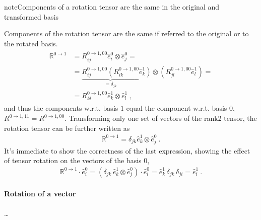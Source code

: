 \documentclass[letterpaper,10pt,english]{jupyterBook}
\begin{document}
\begin{sphinxadmonition}{note}{Components of a rotation tensor are the same in the original and transformed basis}

\sphinxAtStartPar
Components of the rotation tensor are the same if referred to the original or to the rotated basis.
\begin{equation*}
\begin{split}\begin{aligned}
  \mathbb{R}^{0 \rightarrow 1} 
  & = R^{0 \rightarrow 1, 00}_{ij} \hat{e}^0_i \otimes \hat{e}^0_j = \\
  & = \underbrace{ R^{0 \rightarrow 1, 00}_{ij}  \left( R^{0 \rightarrow 1, 00 }_{ik}\right.}_{= \delta_{jk}} \left. \hat{e}^1_k \right) \otimes \left( R^{0 \rightarrow 1, 00}_{jl} \hat{e}^1_l \right) = \\
  & = R^{0 \rightarrow 1, 00}_{kl} \hat{e}^1_k \otimes \hat{e}^1_{l} \ ,
\end{aligned}\end{split}
\end{equation*}
\sphinxAtStartPar
and thus the components w.r.t. basis \(1\) equal the component w.r.t. basis \(0\), \(R^{0 \rightarrow 1, 11} = R^{0\rightarrow 1, 00}\).
Transforming only one set of vectors of the rank\sphinxhyphen{}2 tensor, the rotation tensor can be further written as
\begin{equation*}
\begin{split}\mathbb{R}^{0 \rightarrow 1} = \delta_{jk} \hat{e}^1_k \otimes \hat{e}^0_j \ .\end{split}
\end{equation*}
\sphinxAtStartPar
It’s immediate to show the correctness of the last expression, showing the effect of tensor rotation on the vectors of the basis \(0\),
\begin{equation*}
\begin{split}\mathbb{R}^{0 \rightarrow 1} \cdot \hat{e}^0_i = \left( \delta_{jk} \, \hat{e}^1_k \otimes \hat{e}^0_j \right) \cdot \hat{e}^0_i = \hat{e}^1_k \, \delta_{jk} \, \delta_{ji} = \hat{e}^1_i \ .\end{split}
\end{equation*}\end{sphinxadmonition}


\paragraph{Rotation of a vector}
\label{\detokenize{ch/kinematics-rotations-tensors:rotation-of-a-vector}}
\sphinxAtStartPar
…
\end{document}
